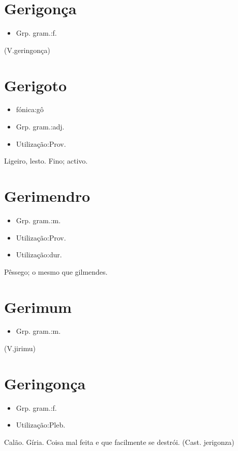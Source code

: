 \section{Gerigonça}
\begin{itemize}
\item {Grp. gram.:f.}
\end{itemize}
(V.geringonça)
\section{Gerigoto}
\begin{itemize}
\item {fónica:gô}
\end{itemize}
\begin{itemize}
\item {Grp. gram.:adj.}
\end{itemize}
\begin{itemize}
\item {Utilização:Prov.}
\end{itemize}
Ligeiro, lesto.
Fino; activo.
\section{Gerimendro}
\begin{itemize}
\item {Grp. gram.:m.}
\end{itemize}
\begin{itemize}
\item {Utilização:Prov.}
\end{itemize}
\begin{itemize}
\item {Utilização:dur.}
\end{itemize}
Pêssego; o mesmo que \textunderscore gilmendes\textunderscore .
\section{Gerimum}
\begin{itemize}
\item {Grp. gram.:m.}
\end{itemize}
(V.jirimu)
\section{Geringonça}
\begin{itemize}
\item {Grp. gram.:f.}
\end{itemize}
\begin{itemize}
\item {Utilização:Pleb.}
\end{itemize}
Calão.
Gíria.
Coisa mal feita e que facilmente se destrói.
(Cast. \textunderscore jerigonza\textunderscore )

